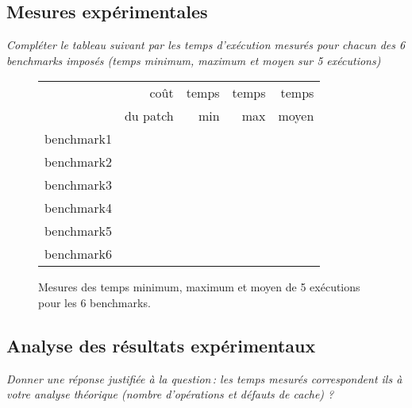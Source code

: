 \documentclass[a4paper, 10pt, french]{article}
\begin{document}
  \subsection{Mesures expérimentales}
	{\em Compléter le tableau suivant par les temps d'exécution mesurés pour chacun des 6 benchmarks imposés
			  (temps minimum, maximum et moyen sur 5 exécutions)
	}

	\begin{figure}[h]
		\begin{center}
			\begin{tabular}{|l||r||r|r|r||}
				\hline
				\hline
				& coût         & temps     & temps   & temps \\
				& du patch     & min       & max     & moyen \\
				\hline
				\hline
				benchmark1 &      &     &     &     \\
				\hline
				benchmark2 &      &     &     &     \\
				\hline
				benchmark3 &      &     &     &     \\
				\hline
				benchmark4 &      &     &     &     \\
				\hline
				benchmark5 &      &     &     &     \\
				\hline
				benchmark6 &      &     &     &     \\
				\hline
				\hline
			\end{tabular}
			\caption{Mesures des temps minimum, maximum et moyen de 5 exécutions pour les 6 benchmarks.}
			\label{table-temps}
		\end{center}
	\end{figure}

\subsection{Analyse des résultats expérimentaux}
{\em Donner  une réponse justifiée  à la question\,: 
			  les  temps mesurés correspondent ils  à votre analyse théorique (nombre d’opérations et défauts de cache) ?
}
\end{document}

